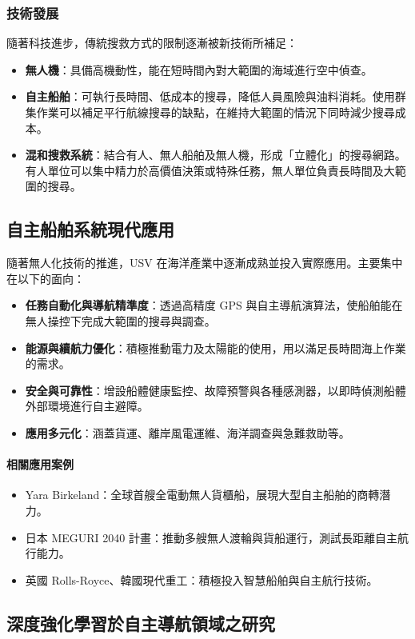 \documentclass[12pt,a4paper]{article}
\begin{document}
\subsubsection{技術發展}
隨著科技進步，傳統搜救方式的限制逐漸被新技術所補足：
\begin{itemize}
  \item \textbf{無人機}：具備高機動性，能在短時間內對大範圍的海域進行空中偵查。
  \item \textbf{自主船舶}：可執行長時間、低成本的搜尋，降低人員風險與油料消耗。使用群集作業可以補足平行航線搜尋的缺點，在維持大範圍的情況下同時減少搜尋成本。
  \item \textbf{混和搜救系統}：結合有人、無人船舶及無人機，形成「立體化」的搜尋網路。有人單位可以集中精力於高價值決策或特殊任務，無人單位負責長時間及大範圍的搜尋。
\end{itemize}

\subsection{自主船舶系統現代應用}
隨著無人化技術的推進，USV 在海洋產業中逐漸成熟並投入實際應用。主要集中在以下的面向：
\begin{itemize}
  \item \textbf{任務自動化與導航精準度}：透過高精度 GPS 與自主導航演算法，使船舶能在無人操控下完成大範圍的搜尋與調查。
  \item \textbf{能源與續航力優化}：積極推動電力及太陽能的使用，用以滿足長時間海上作業的需求。
  \item \textbf{安全與可靠性}：增設船體健康監控、故障預警與各種感測器，以即時偵測船體外部環境進行自主避障。
  \item \textbf{應用多元化}：涵蓋貨運、離岸風電運維、海洋調查與急難救助等。
\end{itemize}

\paragraph{相關應用案例}
\begin{itemize}
  \item Yara Birkeland：全球首艘全電動無人貨櫃船，展現大型自主船舶的商轉潛力。
  \item 日本 MEGURI 2040 計畫：推動多艘無人渡輪與貨船運行，測試長距離自主航行能力。
  \item 英國 Rolls-Royce、韓國現代重工：積極投入智慧船舶與自主航行技術。
\end{itemize}

\subsection{深度強化學習於自主導航領域之研究}
\end{document}
